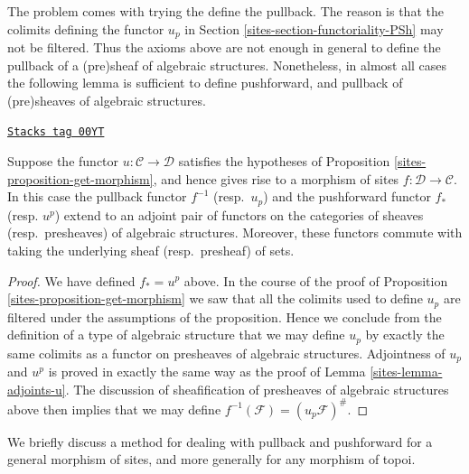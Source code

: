 The problem comes with trying the define the pullback.
The reason is that the colimits defining
the functor $u_p$ in Section \ref{sites-section-functoriality-PSh}
may not be filtered. Thus the axioms above are not enough in
general to define the pullback of a (pre)sheaf of algebraic
structures. Nonetheless, in almost all cases the following
lemma is sufficient to define pushforward, and pullback
of (pre)sheaves of algebraic structures.

\begin{lemma}
\label{sites-lemma-push-pull-good-case}
\href{https://stacks.math.columbia.edu/tag/00YT}{\texttt{Stacks tag 00YT}}

Suppose the functor $u : \mathcal{C} \to \mathcal{D}$ satisfies
the hypotheses of Proposition \ref{sites-proposition-get-morphism},
and hence gives rise to a morphism of sites
$f : \mathcal{D} \to \mathcal{C}$. In this case
the pullback functor $f^{-1}$ (resp.\ $u_p$) and the pushforward
functor $f_*$ (resp. $u^p$) extend to an adjoint pair of functors on
the categories of sheaves (resp.\ presheaves)  of algebraic structures.
Moreover, these functors commute with taking
the underlying sheaf (resp.\ presheaf) of sets.
\end{lemma}

\begin{proof}

We have defined $f_* = u^p$ above.
In the course of the proof of Proposition \ref{sites-proposition-get-morphism}
we saw that all the colimits used to define $u_p$ are
filtered under the assumptions of the proposition.
Hence we conclude from the definition of a type of
algebraic structure that we may define $u_p$ by exactly
the same colimits as a functor on presheaves of algebraic structures.
Adjointness of $u_p$ and $u^p$ is proved in exactly the
same way as the proof of Lemma \ref{sites-lemma-adjoints-u}.
The discussion of sheafification of presheaves of
algebraic structures above then implies that we may define
$f^{-1}(\mathcal{F}) = (u_p\mathcal{F})^\#$.
\end{proof}

We briefly discuss a method for dealing with pullback and
pushforward for a general morphism of sites, and more generally
for any morphism of topoi.

